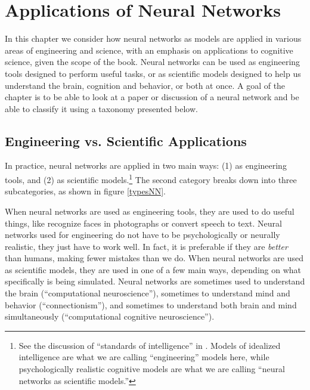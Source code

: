 \chapter{Applications of Neural Networks}\label{ch_applications}


In this chapter we consider how neural networks as models are applied in various areas of engineering and science, with an emphasis on applications to cognitive science, given the scope of the book. Neural networks can be used as engineering tools designed to perform useful tasks, or as scientific models designed to help us understand the brain, cognition and behavior, or both at once. A goal of the chapter is to be able to look at a paper or discussion of a neural network and be able to classify it using a taxonomy presented below.

\section{Engineering vs. Scientific Applications}

In practice, neural networks are applied in two main ways: (1) as engineering tools, and (2) as scientific models.\footnote{See the discussion of ``standards of intelligence'' in \cite{noelle2022artificial}. Models of idealized intelligence are what we are calling ``engineering'' models here, while psychologically realistic cognitive models are what we are calling ``neural networks as scientific models.''} The second category breaks down into three subcategories, as shown in figure \ref{typesNN}.

When neural networks are used as engineering tools, they are used to do useful things, like recognize faces in photographs or convert speech to text. Neural networks used for engineering do not have to be psychologically or neurally realistic, they just have to work well. In fact, it is preferable if they are \emph{better} than humans, making fewer mistakes than we do. When neural networks are used as scientific models, they are used in one of a few main ways, depending on what specifically is being simulated. Neural networks are sometimes used to understand the brain (``computational neuroscience''), sometimes to understand mind and behavior (``connectionism''), and sometimes to understand both brain and mind simultaneously (``computational cognitive neuroscience''). 



